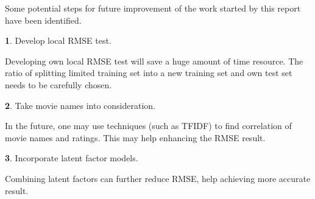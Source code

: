 \documentclass{ece}
\begin{document}
Some potential steps for future improvement of the work started by this report have been identified.

\textbf{1}. Develop local RMSE test.

Developing own local RMSE test will save a huge amount of time resource. The ratio of splitting limited training set into a new training set and own test set needs to be carefully chosen. 

\textbf{2}. Take movie names into consideration.

In the future, one may use techniques (such as TFIDF) to find correlation of movie names and ratings.
This may help enhancing the RMSE result.

\textbf{3}. Incorporate latent factor models.

Combining latent factors can further reduce RMSE, help achieving more accurate result.


\printbibliography[heading=none]


%
%
\end{document}
